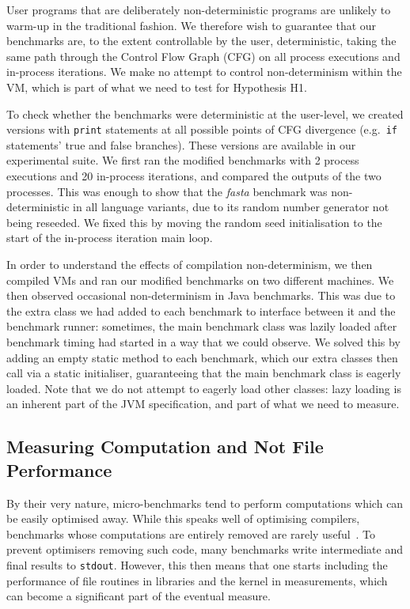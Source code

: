 \documentclass[preprint,numbers,10pt]{sigplanconf}
\newcommand{\fasta}{\emph{fasta}\xspace}
\begin{document}
User programs that are deliberately non-deterministic programs are unlikely to
warm-up in the traditional fashion.
We therefore wish to guarantee that our benchmarks are,
to the extent controllable by the user, deterministic, taking
the same path through the Control Flow Graph (CFG)
on all process executions and in-process iterations. We make no attempt to
control non-determinism within the VM, which is part of what we need to test for
Hypothesis H1.

To check whether the benchmarks were deterministic at the user-level, we created
versions with \texttt{print} statements at all possible points of CFG
divergence (e.g.~\texttt{if} statements' true and false branches).
These versions are available in our experimental suite. We first ran the modified
benchmarks with 2 process executions and 20 in-process iterations,
and compared the outputs of the two processes. This was enough to show that the
\fasta benchmark was non-deterministic
in all language variants, due to its random number generator not being reseeded. We
fixed this by moving the random seed initialisation to the start
of the in-process iteration main loop.

In order to understand the effects of compilation non-determinism,
we then compiled VMs and ran our modified benchmarks on two different machines.
We then observed occasional non-determinism in Java benchmarks.
This was due to the extra class we had added to each benchmark
to interface between it and the benchmark runner: sometimes, the
main benchmark class was lazily loaded after benchmark timing had started in a
way that we could observe. We
solved this by adding an empty static method to each benchmark, which our
extra classes then call via a static initialiser, guaranteeing that
the main benchmark class is eagerly loaded. Note that we do not attempt to eagerly
load other classes: lazy loading is an inherent part of the JVM specification,
and part of what we need to measure.


\subsection{Measuring Computation and Not File Performance}

By their very nature, micro-benchmarks tend to perform computations which
can be easily optimised away. While this speaks well of
optimising compilers, benchmarks whose computations
are entirely removed are rarely useful~\cite{seaton15phd}. To prevent optimisers
removing such code, many benchmarks write intermediate and final results
to \texttt{stdout}. However, this then means that one starts including
the performance of file routines in libraries and the kernel in measurements,
which can become a significant part of the eventual measure.
\end{document}
